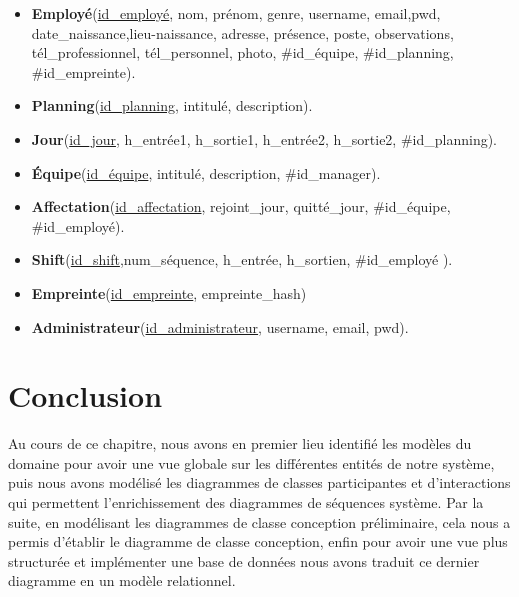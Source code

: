 \begin{itemize}
    \item [\textbullet]\textbf{Employé}(\underline{id\_employé}, nom, prénom, genre, 
        username, email,pwd, date\_naissance,lieu-naissance, adresse, présence, poste, 
        observations, tél\_professionnel, tél\_personnel, photo, \#id\_équipe, 
        \#id\_planning, \#id\_empreinte).

	\item [\textbullet]\textbf{Planning}(\underline{id\_planning}, intitulé, 
        description).
    
    \item [\textbullet]\textbf{Jour}(\underline{id\_jour}, h\_entrée1, h\_sortie1, 
        h\_entrée2, h\_sortie2, \#id\_planning).
    
    \item [\textbullet]\textbf{Équipe}(\underline{id\_équipe}, intitulé, 
        description, \#id\_manager).
    
    \item [\textbullet]\textbf{Affectation}(\underline{id\_affectation}, 
        rejoint\_jour, quitté\_jour, \#id\_équipe, \#id\_employé).
    
    \item [\textbullet]\textbf{Shift}(\underline{id\_shift},num\_séquence, 
        h\_entrée, h\_sortien, \#id\_employé ).
    
    \item [\textbullet]\textbf{Empreinte}(\underline{id\_empreinte}, 
        empreinte\_hash)
    
    \item [\textbullet]\textbf{Administrateur}(\underline{id\_administrateur}, 
        username, email, pwd).
\end{itemize}


\section{Conclusion}
Au cours de ce chapitre, nous avons en premier lieu identifié les modèles du 
domaine pour avoir une vue globale sur les différentes entités de notre système, 
puis nous avons modélisé les diagrammes de classes participantes et 
d’interactions qui permettent l’enrichissement des diagrammes de séquences 
système. Par la suite, en modélisant les diagrammes de classe conception 
préliminaire, cela nous a permis d’établir le diagramme de classe conception, 
enfin pour avoir une vue plus structurée et implémenter une base de données 
nous avons traduit ce dernier diagramme en un modèle relationnel. 
